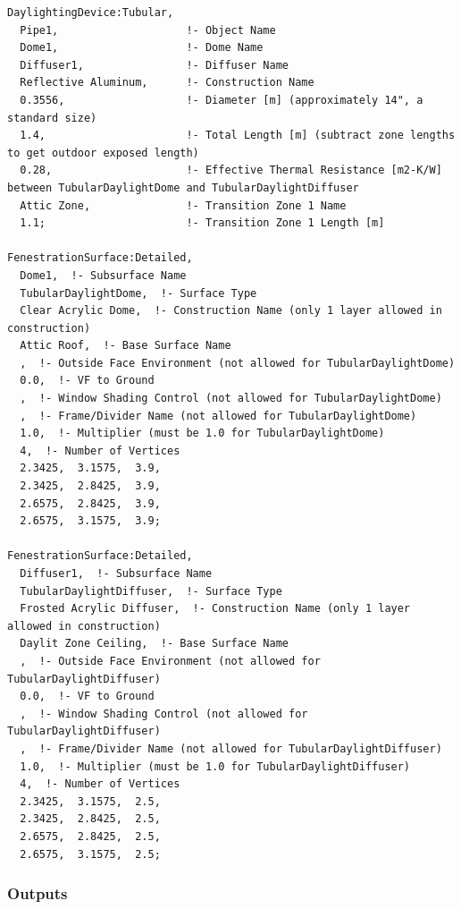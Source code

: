 \begin{lstlisting}
DaylightingDevice:Tubular,
  Pipe1,                    !- Object Name
  Dome1,                    !- Dome Name
  Diffuser1,                !- Diffuser Name
  Reflective Aluminum,      !- Construction Name
  0.3556,                   !- Diameter [m] (approximately 14", a standard size)
  1.4,                      !- Total Length [m] (subtract zone lengths to get outdoor exposed length)
  0.28,                     !- Effective Thermal Resistance [m2-K/W] between TubularDaylightDome and TubularDaylightDiffuser
  Attic Zone,               !- Transition Zone 1 Name
  1.1;                      !- Transition Zone 1 Length [m]

FenestrationSurface:Detailed,
  Dome1,  !- Subsurface Name
  TubularDaylightDome,  !- Surface Type
  Clear Acrylic Dome,  !- Construction Name (only 1 layer allowed in construction)
  Attic Roof,  !- Base Surface Name
  ,  !- Outside Face Environment (not allowed for TubularDaylightDome)
  0.0,  !- VF to Ground
  ,  !- Window Shading Control (not allowed for TubularDaylightDome)
  ,  !- Frame/Divider Name (not allowed for TubularDaylightDome)
  1.0,  !- Multiplier (must be 1.0 for TubularDaylightDome)
  4,  !- Number of Vertices
  2.3425,  3.1575,  3.9,
  2.3425,  2.8425,  3.9,
  2.6575,  2.8425,  3.9,
  2.6575,  3.1575,  3.9;

FenestrationSurface:Detailed,
  Diffuser1,  !- Subsurface Name
  TubularDaylightDiffuser,  !- Surface Type
  Frosted Acrylic Diffuser,  !- Construction Name (only 1 layer allowed in construction)
  Daylit Zone Ceiling,  !- Base Surface Name
  ,  !- Outside Face Environment (not allowed for TubularDaylightDiffuser)
  0.0,  !- VF to Ground
  ,  !- Window Shading Control (not allowed for TubularDaylightDiffuser)
  ,  !- Frame/Divider Name (not allowed for TubularDaylightDiffuser)
  1.0,  !- Multiplier (must be 1.0 for TubularDaylightDiffuser)
  4,  !- Number of Vertices
  2.3425,  3.1575,  2.5,
  2.3425,  2.8425,  2.5,
  2.6575,  2.8425,  2.5,
  2.6575,  3.1575,  2.5;
\end{lstlisting}

\subsubsection{Outputs}\label{outputs-2-004}

